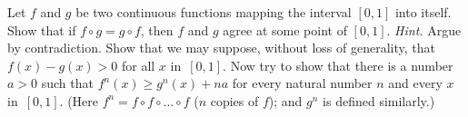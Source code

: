 \begin{prob}Let $f$ and $g$ be two continuous functions mapping the interval $[0,1]$ into itself.
Show that if $f \circ g = g \circ f$, then $f$ and $g$ agree at some point of $[0,1]$.
\emph{Hint.} Argue by contradiction. Show that we may suppose, without loss of generality,
that $f(x) - g(x) > 0$ for all $x$ in~$[0,1]$.  Now try to show that there is a number $a > 0$
such that $f^n(x) \ge g^n(x) + na$ for every natural number $n$ and every $x$ in~$[0,1]$.
(Here $f^n = f \circ f \circ \dots \circ f$ ($n$ copies of $f$); and $g^n$ is defined
similarly.)
\end{prob}



\endinput
